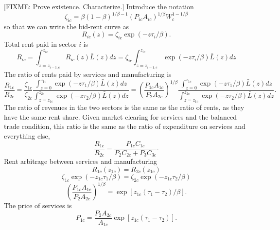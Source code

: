 \documentclass[12pt]{article}
\begin{document}
[FIXME: Prove existence. Characterize.]
Introduce the notation 
\begin{equation}\label{eq:zeta}
\zeta_{ic}=\beta(1-\beta)^{1/\beta-1} (P_{ic}A_{ic})^{1/\beta} W_c^{1-1/\beta}
\end{equation}
so that we can write the bid-rent curve as 
\[
R_{ic}(z) = \zeta_{ic}\exp(-z \tau_i/\beta).
\]
Total rent paid in sector $i$ is
\[
R_{ic} = \int_{z=z_{i-1,c}}^{z_{ic}} R_{ic}(z)\bar L(z)dz = 
\zeta_{ic}\int_{z=z_{i-1,c}}^{z_{ic}} \exp(-z \tau_i/\beta)\bar L(z)dz
\]
The ratio of rents paid by services and manufacturing is
\[
\frac {R_{1c}}{R_{2c}} =
\frac {\zeta_{1c}}
	{\zeta_{2c}}
\frac {\int_{z=0}^{z_{1c}} \exp(-z \tau_1/\beta)\bar L(z)dz}
	{\int_{z=z_{1c}}^{z_{2c}} \exp(-z \tau_2/\beta)\bar L(z)dz}
=
\left(\frac {P_{1c}A_{1c}}
	{P_{2}A_{2c}}
	\right)^{1/\beta}
\frac {\int_{z=0}^{z_{1c}} \exp(-z \tau_1/\beta)\bar L(z)dz}
	{\int_{z=z_{1c}}^{z_{2c}} \exp(-z \tau_2/\beta)\bar L(z)dz}.
\]
The ratio of revenues in the two sectors is the same as the ratio of rents, as they have the same rent share. Given market clearing for services and the balanced trade condition, this ratio is the same as the ratio of expenditure on services and everything else,
\[
\frac{R_{1c}}{R_{2c}}=
\frac{P_{1c}C_{1c}}{P_{2}C_{2c}+P_{3}C_{3c}}.
\]
Rent arbitrage between services and manufacturing
\[
R_{1c}(z_{1c}) = R_{2c}(z_{1c})
\]
\[
\zeta_{1c}\exp(-z_{1c} \tau_1/\beta)=
\zeta_{2c}\exp(-z_{1c} \tau_2/\beta)
\]
\[
\left(\frac {P_{1c}A_{1c}}
	{P_{2}A_{2c}}
	\right)^{1/\beta}
= \exp[z_{1c}(\tau_1-\tau_2)/\beta].
\]
The price of services is
\begin{equation}\tag{i}\label{eq:SCE1}
P_{1c}
= \frac {P_{2}A_{2c}} 
	{A_{1c}}
\exp[z_{1c}(\tau_1-\tau_2)].
\end{equation}
\end{document}
